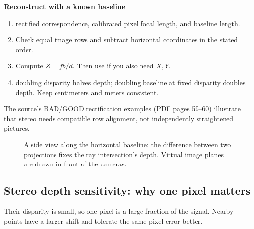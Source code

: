 \documentclass[letterpaper,11pt,english,openany,oneside]{jupyterBook}
\begin{document}

\begin{TextbookBox}
\textbf{Reconstruct with a known baseline}\par\smallskip
\begin{enumerate}
%
\item {}
\sphinxAtStartPar
{} rectified correspondence, calibrated pixel focal length, and baseline length.

\item {}
\sphinxAtStartPar
Check equal image rows and subtract horizontal coordinates in the stated order.

\item {}
\sphinxAtStartPar
Compute \(Z=fb/d\). Then use {\hyperref[\detokenize{lectures/lecture01/cameras::doc}]{}} if you also need \(X,Y\).

\item {}
\sphinxAtStartPar
{} doubling disparity halves depth; doubling baseline at fixed disparity doubles depth. Keep centimeters and meters consistent.

\end{enumerate}

\sphinxAtStartPar
The source’s BAD/GOOD rectification examples (PDF pages 59–60) illustrate that stereo needs compatible row alignment, not independently straightened pictures.

\end{TextbookBox}

\begin{figure}[H]
\centering
\capstart

\noindent{}
\caption{A side view along the horizontal baseline: the difference between two projections fixes the ray intersection’s depth. Virtual image planes are drawn in front of the cameras.}\label{\detokenize{lectures/lecture04/stereo:fig-lec04-stereo-rays}}\end{figure}


\subsection{Stereo depth sensitivity: why one pixel matters}
\label{\detokenize{lectures/lecture04/stereo:stereo-depth-sensitivity-why-one-pixel-matters}}\label{\detokenize{lectures/lecture04/stereo:stereo-depth-sensitivity}}
\sphinxAtStartPar
{} Their disparity is small, so one pixel is a large fraction of the signal. Nearby points have a larger shift and tolerate the same pixel error better.
\end{document}
